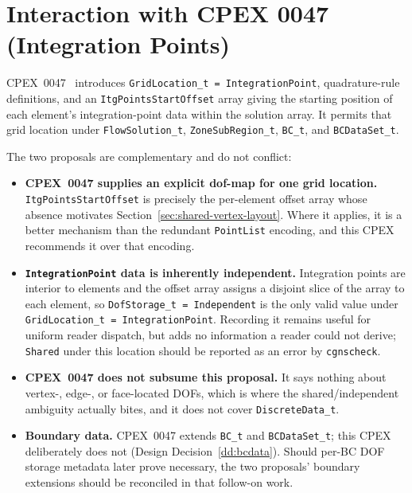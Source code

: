 \documentclass[11pt,letterpaper]{article}
\begin{document}
\section{Interaction with CPEX 0047 (Integration Points)}

CPEX~0047~\cite{cpex0047} introduces
\texttt{GridLocation\_t = IntegrationPoint}, quadrature-rule
definitions, and an \texttt{ItgPointsStartOffset} array giving the
starting position of each element's integration-point data within the
solution array.  It permits that grid location under
\texttt{FlowSolution\_t}, \texttt{ZoneSubRegion\_t}, \texttt{BC\_t},
and \texttt{BCDataSet\_t}.

The two proposals are complementary and do not conflict:

\begin{itemize}[leftmargin=2em]
\item \textbf{CPEX~0047 supplies an explicit dof-map for one grid
  location.}  \texttt{ItgPointsStartOffset} is precisely the
  per-element offset array whose absence motivates
  Section~\ref{sec:shared-vertex-layout}.  Where it applies, it is a
  better mechanism than the redundant \texttt{PointList} encoding, and
  this CPEX recommends it over that encoding.

\item \textbf{\texttt{IntegrationPoint} data is inherently
  independent.}  Integration points are interior to elements and the
  offset array assigns a disjoint slice of the array to each element,
  so \texttt{DofStorage\_t = Independent} is the only valid value under
  \texttt{GridLocation\_t = IntegrationPoint}.  Recording it remains
  useful for uniform reader dispatch, but adds no information a reader
  could not derive; \texttt{Shared} under this location should be
  reported as an error by \texttt{cgnscheck}.

\item \textbf{CPEX~0047 does not subsume this proposal.}  It says
  nothing about vertex-, edge-, or face-located DOFs, which is where
  the shared/independent ambiguity actually bites, and it does not
  cover \texttt{DiscreteData\_t}.

\item \textbf{Boundary data.}  CPEX~0047 extends \texttt{BC\_t} and
  \texttt{BCDataSet\_t}; this CPEX deliberately does not
  (Design Decision~\ref{dd:bcdata}).  Should per-BC DOF storage
  metadata later prove necessary, the two proposals' boundary
  extensions should be reconciled in that follow-on work.
\end{itemize}
\end{document}
